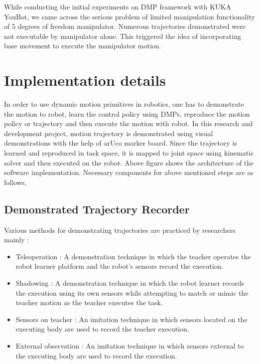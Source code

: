 While conducting the initial experiments on DMP framework with KUKA YouBot, we came across the serious problem of limited manipulation functionality of 5 degrees of freedom manipulator. Numerous trajectories demonstrated were not executable by manipulator alone. This triggered the idea of incorporating base movement to execute the manipulator motion. 


  

\section{Implementation details}

In order to use dynamic motion primitives in robotics, one has to demonstrate the motion to robot, learn the control policy using DMPs, reproduce the motion policy or trajectory and then execute the motion with robot. In this research and development project, motion trajectory is demonstrated using visual demonstrations with the help of arUco marker board. Since the trajectory is learned and reproduced in task space, it is mapped to joint space using kinematic solver and then executed on the robot. Above figure shows the architecture of the software implementation. Necessary components for above mentioned steps are as follows, 

\subsection{Demonstrated Trajectory Recorder}
Various methods for demonstrating trajectories are practiced by researchers mainly :
\begin{itemize} 
	
	\item Teleoperation : A demonstration technique in which the teacher operates the robot learner platform and the robot’s sensors record the execution. 	\cite{argall2009survey}	
	
	\item Shadowing : A demonstration technique in which the robot learner records the execution using its own sensors while attempting to match or mimic the teacher motion as the teacher executes the task.
	
	\item Sensors on teacher : An imitation technique in which sensors located on the executing body are used to record the teacher execution.
	
	\item External observation : An imitation technique in which sensors external to the executing body are used to record the execution.
	
\end{itemize}

